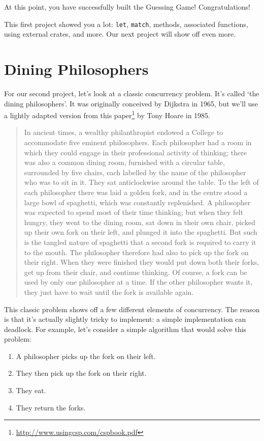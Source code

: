 \documentclass[a4paper,]{book}
\renewcommand{\href}[2]{#2\footnote{\url{#1}}}
\begin{document}
At this point, you have successfully built the Guessing Game!
Congratulations!

This first project showed you a lot: \texttt{let}, \texttt{match},
methods, associated functions, using external crates, and more. Our next
project will show off even more.

\section{Dining Philosophers}\label{sec--dining-philosophers}

For our second project, let's look at a classic concurrency problem.
It's called `the dining philosophers'. It was originally conceived by
Dijkstra in 1965, but we'll use a lightly adapted version from
\href{http://www.usingcsp.com/cspbook.pdf}{this paper} by Tony Hoare in
1985.

\begin{quote}
In ancient times, a wealthy philanthropist endowed a College to
accommodate five eminent philosophers. Each philosopher had a room in
which they could engage in their professional activity of thinking;
there was also a common dining room, furnished with a circular table,
surrounded by five chairs, each labelled by the name of the philosopher
who was to sit in it. They sat anticlockwise around the table. To the
left of each philosopher there was laid a golden fork, and in the centre
stood a large bowl of spaghetti, which was constantly replenished. A
philosopher was expected to spend most of their time thinking; but when
they felt hungry, they went to the dining room, sat down in their own
chair, picked up their own fork on their left, and plunged it into the
spaghetti. But such is the tangled nature of spaghetti that a second
fork is required to carry it to the mouth. The philosopher therefore had
also to pick up the fork on their right. When they were finished they
would put down both their forks, get up from their chair, and continue
thinking. Of course, a fork can be used by only one philosopher at a
time. If the other philosopher wants it, they just have to wait until
the fork is available again.
\end{quote}

This classic problem shows off a few different elements of concurrency.
The reason is that it's actually slightly tricky to implement: a simple
implementation can deadlock. For example, let's consider a simple
algorithm that would solve this problem:

\begin{enumerate}
\def\labelenumi{\arabic{enumi}.}
\itemsep1pt\parskip0pt
\item
  A philosopher picks up the fork on their left.
\item
  They then pick up the fork on their right.
\item
  They eat.
\item
  They return the forks.
\end{enumerate}
\end{document}

